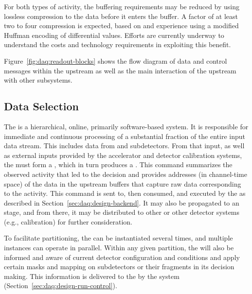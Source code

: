 \begin{itemize}
For both types of activity, the buffering requirements may be reduced by
using lossless compression to the data before it enters the buffer. A
factor of at least two to four compression is expected, based on
 \cite{bib:uBsnreadout2019} 
and  experience using a modified Huffman encoding of
differential  values.  Efforts are currently underway to understand the
costs and technology requirements in exploiting this benefit.

\end{itemize}




Figure~\ref{fig:daq:readout-blocks} shows the flow diagram of data and control messages within the upstream  
as well as the main interaction of the upstream  with other subsystems.

\subsection{Data Selection}
\label{sec:daq:design-data-selection}

The   is a hierarchical, online, primarily
software-based system. It is responsible for immediate and continuous processing of a substantial fraction of the entire input data stream. 
This includes data from 
%
 and  subdetectors.
%
From that input, as well as external inputs provided by
the accelerator and detector calibration systems, the  must form a ,
which in turn produces a .
This command summarizes the observed activity that led to the decision
and provides addresses (in channel-time space) of the data in the
upstream  buffers that capture raw data
corresponding to the activity.
This command is sent to, then consumed, and executed by the  as described in Section~\ref{sec:daq:design-backend}. 
It may also be propagated to an  stage, and from there, it may be
distributed to other  or other detector systems
(e.g., calibration) for further consideration.

To facilitate partitioning, the   can be instantiated several times, 
and multiple instances can operate in parallel. Within any
given partition, the  will also be
informed and aware of current detector configuration and conditions and
apply certain masks and mapping on subdetectors or their fragments in
its decision making. This information is delivered to the
 by the  system (Section~\ref{sec:daq:design-run-control}).

